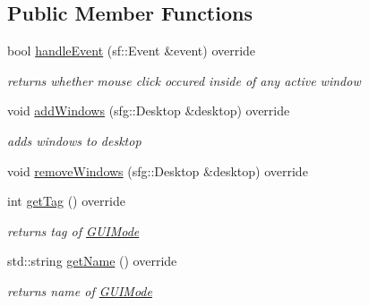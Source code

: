 \subsection*{Public Member Functions}
\begin{DoxyCompactItemize}
\item 
\hypertarget{classGUIModeMiner_af36ccd84103f5e0ce83498069612a38f}{bool \hyperlink{classGUIModeMiner_af36ccd84103f5e0ce83498069612a38f}{handle\-Event} (sf\-::\-Event \&event) override}\label{classGUIModeMiner_af36ccd84103f5e0ce83498069612a38f}

\begin{DoxyCompactList}\small\item\em returns whether mouse click occured inside of any active window \end{DoxyCompactList}\item 
\hypertarget{classGUIModeMiner_a0a6833450b35219d01d95e7586579d95}{void \hyperlink{classGUIModeMiner_a0a6833450b35219d01d95e7586579d95}{add\-Windows} (sfg\-::\-Desktop \&desktop) override}\label{classGUIModeMiner_a0a6833450b35219d01d95e7586579d95}

\begin{DoxyCompactList}\small\item\em adds windows to desktop \end{DoxyCompactList}\item 
void \hyperlink{classGUIModeMiner_ac494c734e0e209548f7749edd8dfe4b3}{remove\-Windows} (sfg\-::\-Desktop \&desktop) override
\item 
\hypertarget{classGUIModeMiner_a78c53490f8f9ddeb6b5412a93c90d4f3}{int \hyperlink{classGUIModeMiner_a78c53490f8f9ddeb6b5412a93c90d4f3}{get\-Tag} () override}\label{classGUIModeMiner_a78c53490f8f9ddeb6b5412a93c90d4f3}

\begin{DoxyCompactList}\small\item\em returns tag of \hyperlink{classGUIMode}{G\-U\-I\-Mode} \end{DoxyCompactList}\item 
\hypertarget{classGUIModeMiner_a391b51f1090c5779716caa52dca00a88}{std\-::string \hyperlink{classGUIModeMiner_a391b51f1090c5779716caa52dca00a88}{get\-Name} () override}\label{classGUIModeMiner_a391b51f1090c5779716caa52dca00a88}

\begin{DoxyCompactList}\small\item\em returns name of \hyperlink{classGUIMode}{G\-U\-I\-Mode} \end{DoxyCompactList}\end{DoxyCompactItemize}


